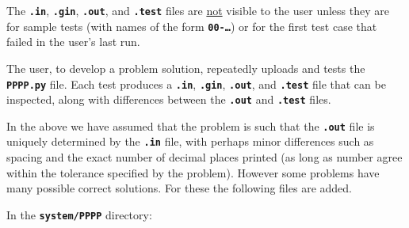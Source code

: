 \documentclass[12pt]{article}
\newcommand{\TT}[1]{{\tt \bfseries #1}}
\begin{document}
The \TT{.in}, \TT{.gin}, \TT{.out}, and \TT{.test} files are \underline{not}
visible to the user unless they are for sample tests
(with names of the form \TT{00-\ldots}) or for the first test
case that failed in the user's last run.

The user, to develop a problem solution, repeatedly uploads and
tests the \TT{PPPP.py} file.  Each test produces a \TT{.in},
\TT{.gin}, \TT{.out}, and \TT{.test} file that can be inspected,
along with differences between the \TT{.out} and \TT{.test}
files.

In the above we have assumed that the problem is such that the
\TT{.out} file is uniquely determined by the \TT{.in} file,
with perhaps minor differences such as spacing and
the exact number of decimal places printed (as long as number
agree within the tolerance specified by the problem).
However some problems have many possible correct solutions.
For these the following files are added.

In the \TT{system/PPPP} directory:
\end{document}
